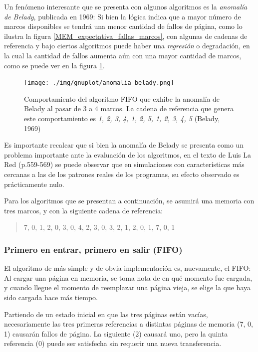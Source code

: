 \documentclass[11pt,fleqn]{book} %
\begin{document}
Un fenómeno interesante que se presenta con algunos algoritmos es la
\emph{anomalía de Belady}, publicada en 1969: Si bien la lógica indica que
a mayor número de marcos disponibles se tendrá una menor cantidad de
fallos de página, como lo ilustra la figura
\ref{MEM_expectativa_fallas_marcos}, con algunas de cadenas de
referencia y bajo ciertos algoritmos puede haber una \emph{regresión} o degradación, en
la cual la cantidad de fallos aumenta aún con una mayor cantidad de
marcos, como se puede ver en la figura \ref{MEM_anomalia_belady}.

\begin{figure}[htb]
\centering
\texttt{[image: ./img/gnuplot/anomalia\_belady.png]}
\caption{\label{MEM_anomalia_belady}Comportamiento del algoritmo FIFO que exhibe la anomalía de Belady al pasar de 3 a 4 marcos. La cadena de referencia que genera este comportamiento es \emph{1, 2, 3, 4, 1, 2, 5, 1, 2, 3, 4, 5} (Belady, 1969)}
\end{figure}

Es importante recalcar que si bien la anomalía de Belady se
presenta como un problema importante ante la evaluación de los
algoritmos, en el texto de Luis La Red (p.559-569) se puede observar
que en simulaciones con características más cercanas a las de los
patrones reales de los programas, su efecto observado es
prácticamente nulo.

Para los algoritmos que se presentan a continuación, se asumirá una memoria
con tres marcos, y con la siguiente cadena de referencia:

\begin{quote}
7, 0, 1, 2, 0, 3, 0, 4, 2, 3, 0, 3, 2, 1, 2, 0, 1, 7, 0, 1
\end{quote}
\subsubsection{Primero en entrar, primero en salir (FIFO)}
\label{sec-5-5-3-1}
\label{MEM_FIFO}


El algoritmo de más simple y de obvia implementación es, nuevamente, el
FIFO: Al cargar una página en memoria, se toma nota de en qué momento
fue cargada, y cuando llegue el momento de reemplazar una página
vieja, se elige la que haya sido cargada hace más tiempo.

Partiendo de un estado inicial en que las tres páginas están
vacías, necesariamente las tres primeras referencias a distintas
páginas de memoria (7, 0, 1) causarán fallos de página. La siguiente
(2) causará uno, pero la quinta referencia (0) puede ser satisfecha
sin requerir una nueva transferencia.
\end{document}
